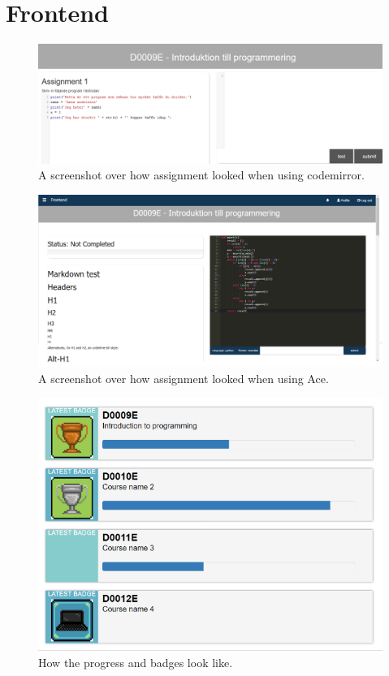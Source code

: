 \section{Frontend}
\begin{figure}[H]
\centering
\includegraphics[scale=0.45]{img/Codemirror_pic.png}
\caption{A screenshot over how assignment looked when using codemirror.}
\end{figure}
\begin{figure}[H]
\centering
\includegraphics[scale=0.5]{img/Ace.png}
\caption{A screenshot over how assignment looked when using Ace. }
\end{figure}
\begin{figure}[H]
\centering
\includegraphics[scale=0.6]{img/Progress.png}
\caption{How the progress and badges look like.}
\end{figure}

